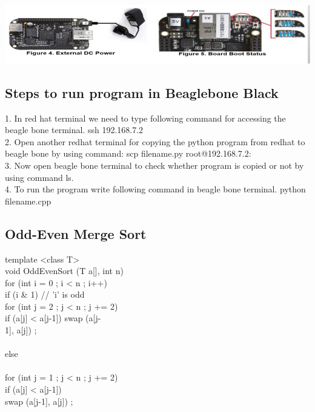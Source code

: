 \documentclass[10pt,a4paper]{article}
\begin{document}
	\includegraphics[width=\textwidth]{bbb_02}
	
	\subsection{Steps to run program in Beaglebone Black}
	1.	In red hat terminal we need to type following command for accessing the beagle bone terminal. 
	ssh 192.168.7.2 \\
	2.	Open another redhat terminal for copying the python program from redhat to beagle bone by using command: 
	scp filename.py root@192.168.7.2: \\
	3.	Now open beagle bone terminal to check whether program is copied or not by using command ls. \\
	4.	To run the program write following command in beagle bone terminal. 
	python filename.cpp \\
	
	\subsection{Odd-Even Merge Sort}
	template <class T> 									\\
	void OddEvenSort (T a[], int n) 					\\
	{ for (int i = 0 ; i < n ; i++) 					\\
		{ if (i \& 1) // 'i' is odd 					\\
			{ for (int j = 2 ; j < n ; j += 2) 			\\
				{ if (a[j] < a[j-1]) swap (a[j-			\\
					1], a[j]) ; 						\\
				} 										\\
			} else 										\\
			{ 											\\
				for (int j = 1 ; j < n ; j += 2) { 		\\
					if (a[j] < a[j-1]) 					\\
					swap (a[j-1], a[j]) ; 				\\
				} 										\\
			} 											\\
		} 												\\
	} 													\\
														\\
	
\end{document}
